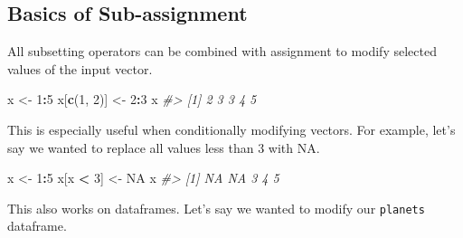 \documentclass[]{book}
\newenvironment{Shaded}{\begin{snugshade}}{\end{snugshade}}
\newcommand{\KeywordTok}[1]{\textcolor[rgb]{0.13,0.29,0.53}{\textbf{#1}}}
\newcommand{\DecValTok}[1]{\textcolor[rgb]{0.00,0.00,0.81}{#1}}
\newcommand{\StringTok}[1]{\textcolor[rgb]{0.31,0.60,0.02}{#1}}
\newcommand{\CommentTok}[1]{\textcolor[rgb]{0.56,0.35,0.01}{\textit{#1}}}
\newcommand{\OtherTok}[1]{\textcolor[rgb]{0.56,0.35,0.01}{#1}}
\newcommand{\OperatorTok}[1]{\textcolor[rgb]{0.81,0.36,0.00}{\textbf{#1}}}
\newcommand{\NormalTok}[1]{#1}
\begin{document}
\subsection{Basics of Sub-assignment}\label{basics-of-sub-assignment}

All subsetting operators can be combined with assignment to modify
selected values of the input vector.

\begin{Shaded}
\begin{Highlighting}[]
\NormalTok{x <-}\StringTok{ }\DecValTok{1}\OperatorTok{:}\DecValTok{5}
\NormalTok{x[}\KeywordTok{c}\NormalTok{(}\DecValTok{1}\NormalTok{, }\DecValTok{2}\NormalTok{)] <-}\StringTok{ }\DecValTok{2}\OperatorTok{:}\DecValTok{3}
\NormalTok{x}
\CommentTok{#> [1] 2 3 3 4 5}
\end{Highlighting}
\end{Shaded}

This is especially useful when conditionally modifying vectors. For
example, let's say we wanted to replace all values less than 3 with NA.

\begin{Shaded}
\begin{Highlighting}[]
\NormalTok{x <-}\StringTok{ }\DecValTok{1}\OperatorTok{:}\DecValTok{5}
\NormalTok{x[x }\OperatorTok{<}\StringTok{ }\DecValTok{3}\NormalTok{] <-}\StringTok{ }\OtherTok{NA}
\NormalTok{x}
\CommentTok{#> [1] NA NA  3  4  5}
\end{Highlighting}
\end{Shaded}

This also works on dataframes. Let's say we wanted to modify our
\texttt{planets} dataframe.
\end{document}
